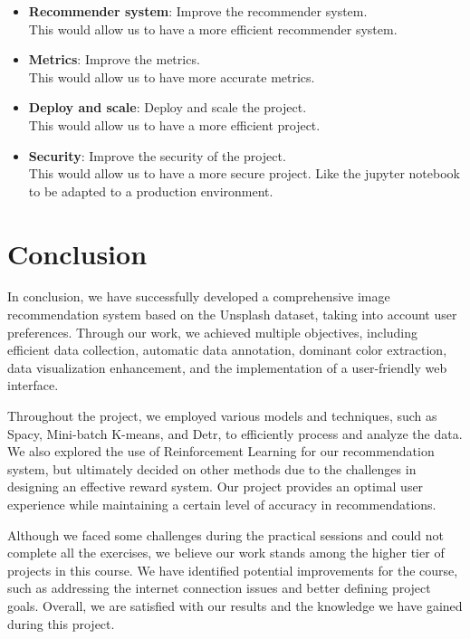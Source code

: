 \documentclass{article}
\begin{document}
\begin{itemize}
        \item \textbf{Recommender system}: Improve the recommender system.\\This would allow us to have a more efficient recommender system.
        \item \textbf{Metrics}: Improve the metrics.\\This would allow us to have more accurate metrics.
        \item \textbf{Deploy and scale}: Deploy and scale the project.\\This would allow us to have a more efficient project.
        \item \textbf{Security}: Improve the security of the project.\\This would allow us to have a more secure project. Like the jupyter notebook to be adapted to a production environment.
    \end{itemize}

    \newpage

    \section{Conclusion}\label{sec:conclusion}

    In conclusion, we have successfully developed a comprehensive image recommendation system based on the Unsplash dataset, taking into account user preferences.
    Through our work, we achieved multiple objectives, including efficient data collection, automatic data annotation, dominant color extraction, data visualization enhancement, and the implementation of a user-friendly web interface.

    Throughout the project, we employed various models and techniques, such as Spacy, Mini-batch K-means, and Detr, to efficiently process and analyze the data.
    We also explored the use of Reinforcement Learning for our recommendation system, but ultimately decided on other methods due to the challenges in designing an effective reward system.
    Our project provides an optimal user experience while maintaining a certain level of accuracy in recommendations.

    Although we faced some challenges during the practical sessions and could not complete all the exercises, we believe our work stands among the higher tier of projects in this course.
    We have identified potential improvements for the course, such as addressing the internet connection issues and better defining project goals.
    Overall, we are satisfied with our results and the knowledge we have gained during this project.
\end{document}
